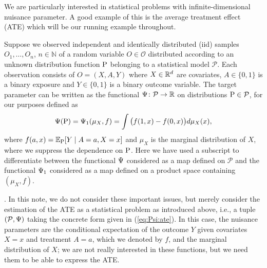 \documentclass[a4,danish]{article}
\begin{document}
We are particularly interested in statistical problems with
infinite-dimensional nuisance parameter.  A good example of this is
the average treatment effect (ATE) which will be our running example
throughout.

\begin{example}[ATE]
  \label{example:aver-treatm-effect}
  Suppose we observed independent and identically distributed (iid) samples \(O_1,\ldots,O_n\),
  \(n\in\mathbb{N}\) of a random variable \(O \in\mathcal{O}\) distributed according to an unknown
  distribution function \(\P\) belonging to a statistical model \(\mathcal{P}\). Each observation
  consists of \(O= (X, A, Y)\) where \(X\in \R^d\) are covariates, \(A\in \lbrace 0,1\rbrace\) is a
  binary exposure and \(Y\in\lbrace 0, 1\rbrace\) is a binary outcome variable. The target parameter
  can be written as the functional \(\TT \colon \mathcal{P} \rightarrow \R\) on distributions
  \(\P\in\mathcal{P}\), for our purposes defined as
  \begin{align}
    \TT(\P) = \TT_1( \mu_X, f) = \int \big( f( 1, x) - f(0, x) \big) d\mu_X (x), 
    \label{eq:Psi:ate}
  \end{align}
  where \(f (a, x) = \E_{\P} [ Y \mid A=a, X=x]\) and \(\mu_X \) is the marginal distribution of
  \(X\), where we suppress the dependence on $\P$. Here we have used a subscript to differentiate
  between the functional $\TT$ considered as a map defined on $\mathcal{P}$ and the functional
  $\TT_1$ considered as a map defined on a product space containing $(\mu_X, f)$.
\end{example}

. In this note, we do
not consider these important issues, but merely consider the estimation of the ATE as a statistical
problem as introduced above, i.e., a tuple $(\mathcal{P}, \TT)$ taking the concrete form given in
(\ref{eq:Psi:ate}). In this case, the nuisance parameters are the conditional expectation of the
outcome $Y$ given covariates $X=x$ and treatment $A=a$, which we denoted by $f$, and the marginal
distribution of $X$; we are not really interested in these functions, but we need them to be able to
express the ATE.
\end{document}
